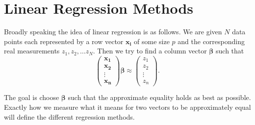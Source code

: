 \documentclass[parskip=half]{scrartcl}
\theoremstyle{definition}
\theoremstyle{remark}
\newcommand{\vect}[1]{{\bm{#1}}}
\begin{document}
\section{Linear Regression Methods} \label{sec:lrm}
 
Broadly speaking the idea of linear regression is as follows.
We are given $N$ data points each represented by a row vector $\vect{x_i}$ of some size $p$ and the corresponding real measurements $z_1, z_2, \ldots z_N$. 
Then we try to find a column vector $\vect{\beta}$ such that 
\[
	\begin{pmatrix}
		\vect{x_1} \\
		\vect{x_2} \\
		\vdots \\
		\vect{x_n}
	\end{pmatrix} \vect{\beta}
	\approx
	\begin{pmatrix} z_1 \\ z_2 \\ \vdots \\ z_n \end{pmatrix}.	
\]

The goal is choose $\vect{\beta}$ such that the approximate equality holds as best as possible. 
Exactly how we measure what it means for two vectors to be approximately equal will define the different regression methods. 
\end{document}
